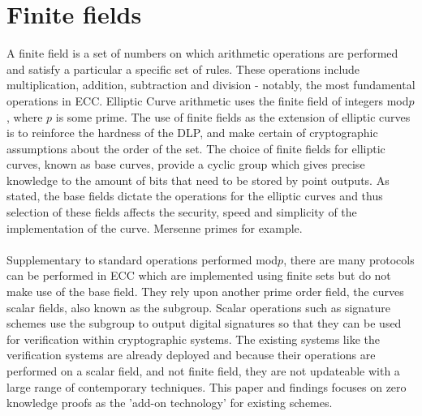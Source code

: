 \documentclass{article}
\begin{document}
\section{Finite fields}
A finite field is a set of numbers on which arithmetic operations are performed and satisfy a particular a specific set of rules. These operations include multiplication, addition, subtraction and division - notably, the most fundamental operations in ECC. Elliptic Curve arithmetic uses the finite field of integers mod$p$, where $p$ is some prime. The use of finite fields as the extension of elliptic curves is to reinforce the hardness of the DLP, and make certain of cryptographic assumptions about the order of the set. The choice of finite fields for elliptic curves, known as base curves, provide a cyclic group which gives precise knowledge to the amount of bits that need to be stored by point outputs. As stated, the base fields dictate the operations for the elliptic curves and thus selection of these fields affects the security, speed and simplicity of the implementation of the curve. Mersenne primes for example.\\\\ 

Supplementary to standard operations performed mod$p$, there are many protocols can be performed in ECC which are implemented using finite sets but do not make use of the base field. They rely upon another prime order field, the curves scalar fields, also known as the subgroup. Scalar operations such as signature schemes use the subgroup to output digital signatures so that they can be used for verification within cryptographic systems. The existing systems like the verification systems are already deployed and because their operations are performed on a scalar field, and not finite field, they are not updateable with a large range of contemporary techniques. This paper and findings focuses on zero knowledge proofs as the 'add-on technology' for existing schemes. 
\end{document}
